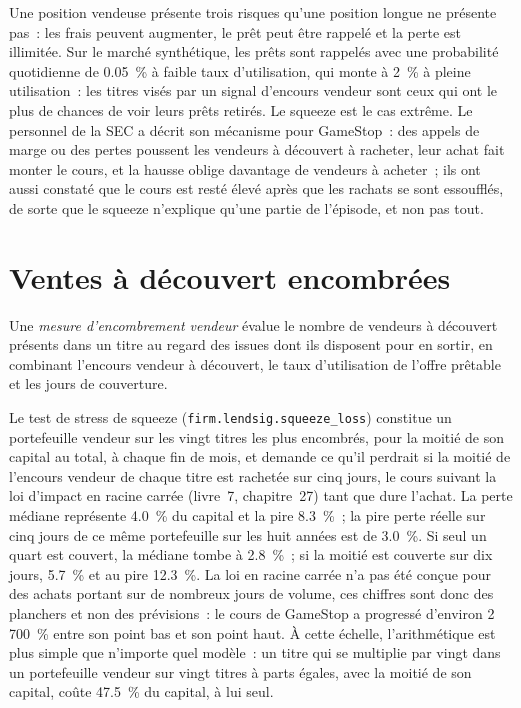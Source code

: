 Une position vendeuse présente trois risques qu'une position longue ne présente pas~: les frais peuvent augmenter, le prêt peut être rappelé et la perte est illimitée. Sur le marché synthétique,
les prêts sont rappelés avec une probabilité quotidienne de 0.05~\% à faible taux d'utilisation, qui monte à 2~\% à pleine utilisation~: les titres visés par un signal d'encours vendeur sont
ceux qui ont le plus de chances de voir leurs prêts retirés. Le squeeze est le cas extrême. Le personnel de la SEC a décrit son mécanisme pour GameStop~: des appels de marge ou des pertes poussent
les vendeurs à découvert à racheter, leur achat fait monter le cours, et la hausse oblige davantage de vendeurs à acheter~; ils ont aussi constaté que le cours est resté élevé après que les rachats
se sont essoufflés, de sorte que le squeeze n'explique qu'une partie de l'épisode, et non pas tout.

\section{Ventes à découvert encombrées}

\begin{definition}\label{def:s1:short-interest-borrow-and-crowding:crowding}
Une \emph{mesure d'encombrement vendeur} évalue le nombre de vendeurs à découvert présents dans un titre au regard des issues dont ils disposent pour en sortir,
en combinant l'encours vendeur à découvert, le taux d'utilisation de l'offre prêtable et les jours de couverture.
\end{definition}

Le test de stress de squeeze (\texttt{firm.lendsig.squeeze\_loss}) constitue un portefeuille vendeur sur les vingt titres les plus
encombrés, pour la moitié de son capital au total, à chaque fin de mois, et demande ce qu'il perdrait si la moitié de l'encours vendeur de chaque titre est rachetée sur cinq jours, le
cours suivant la loi d'impact en racine carrée (livre~7, chapitre~27) tant que dure l'achat. La perte médiane représente 4.0~\% du capital et la pire 8.3~\%~;
la pire perte réelle sur cinq jours de ce même portefeuille sur les huit années est de 3.0~\%. Si seul un quart est couvert, la médiane tombe à 2.8~\%~; si la moitié est couverte sur dix
jours, 5.7~\% et au pire 12.3~\%. La loi en racine carrée n'a pas été conçue pour des achats portant sur de nombreux jours de volume, ces chiffres sont donc des planchers et non des prévisions~: le cours de GameStop
a progressé d'environ 2\,700~\% entre son point bas et son point haut. À cette échelle, l'arithmétique est plus simple que n'importe quel modèle~: un titre qui se multiplie par vingt dans un portefeuille vendeur sur vingt titres
à parts égales, avec la moitié de son capital, coûte 47.5~\% du capital, à lui seul.

